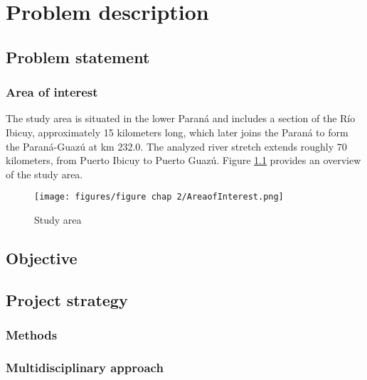 \chapter{Problem description}

\section{Problem statement}
\subsection{Area of interest}
The study area is situated in the lower Paraná and includes a section of the Río Ibicuy, approximately 15 kilometers long, which later joins the Paraná to form the Paraná-Guazú at km 232.0. The analyzed river stretch extends roughly 70 kilometers, from Puerto Ibicuy to Puerto Guazú. Figure \ref{fig:study area} provides an overview of the study area.

\begin{figure}[H]
    \centering
    \texttt{[image: figures/figure chap 2/AreaofInterest.png]}
    \caption{Study area}
    \label{fig:study area}
\end{figure}


\section{Objective}

\section{Project strategy}
\subsection{Methods}
\subsection{Multidisciplinary approach}